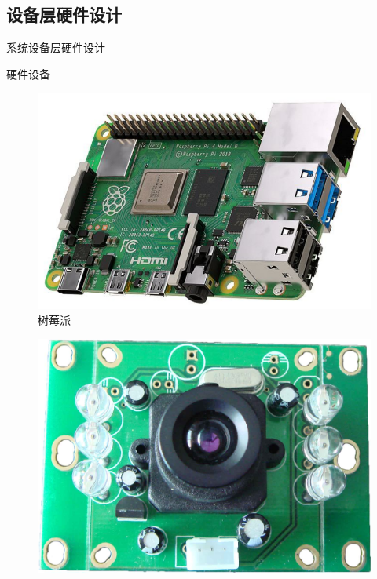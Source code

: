 \documentclass{beamer}
\begin{document}
\subsection{设备层硬件设计}
\begin{frame}{系统设备层硬件设计}
\begin{textbox}{硬件设备}
    \begin{minipage}{0.25\linewidth}
        \medskip
        \begin{figure}[h]
            \centering
            \includegraphics[height=.25\textheight]{smp.png}
            \caption{树莓派}
            \label{树莓派}
        \end{figure}
    \end{minipage}\hspace{1cm}
    \begin{minipage}{0.25\linewidth}
        \medskip
        \begin{figure}[h]
            \centering
            \includegraphics[height=.25\textheight]{Picture/sxt.jpeg}

\end{figure}
\end{minipage}
\end{textbox}
\end{frame}
\end{document}
